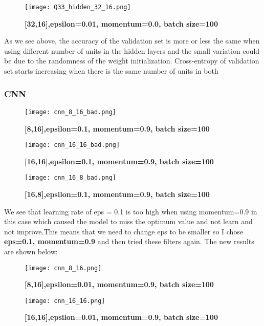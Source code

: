 \documentclass[10pt]{article}
\begin{document}
\begin{figure}[H]
	\centering
	\texttt{[image: Q33\_hidden\_32\_16.png]}
	\caption{\textbf{[32,16],epsilon=0.01, momentum=0.0, batch size=100}}
	\label{fig:}
\end{figure}

As we see above, the accuracy of the validation set is more or less the same when using different number of units in the hidden layers and the small variation could be due to the randomness of the weight initialization. Cross-entropy of validation set starts increasing when there is the same number of units in both 


\subsubsection*{CNN}


\begin{figure}[H]
	\centering
	\texttt{[image: cnn\_8\_16\_bad.png]}
	\caption{\textbf{[8,16],epsilon=0.1, momentum=0.9, batch size=100}}
	\label{fig:}
\end{figure}


\begin{figure}[H]
	\centering
	\texttt{[image: cnn\_16\_16\_bad.png]}
	\caption{\textbf{[16,16],epsilon=0.1, momentum=0.9, batch size=100}}
	\label{fig:}
\end{figure}


\begin{figure}[H]
	\centering
	\texttt{[image: cnn\_16\_8\_bad.png]}
	\caption{\textbf{[16,8],epsilon=0.1, momentum=0.9, batch size=100}}
	\label{fig:}
\end{figure}


We see that learning rate of eps = 0.1 is too high when using momentum=0.9 in this case which caused the model to miss the optimum value and not learn and not improve.This means that we need to change eps to be smaller so I chose \textbf{eps=0.1, momentum=0.9} and then tried these filters again. The new results are shown below:


\begin{figure}[H]
	\centering
	\texttt{[image: cnn\_8\_16.png]}
	\caption{\textbf{[8,16],epsilon=0.01, momentum=0.9, batch size=100}}
	\label{fig:}
\end{figure}


\begin{figure}[H]
	\centering
	\texttt{[image: cnn\_16\_16.png]}
	\caption{\textbf{[16,16],epsilon=0.01, momentum=0.9, batch size=100}}
	\label{fig:}
\end{figure}
\end{document}
